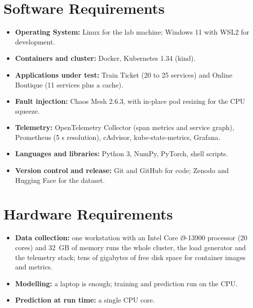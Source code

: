 \documentclass[12pt,a4paper]{report}
\begin{document}
\section{Software Requirements}
\begin{itemize}
\item \textbf{Operating System:} Linux for the lab machine; Windows 11 with WSL2 for development.
\item \textbf{Containers and cluster:} Docker, Kubernetes 1.34 (kind).
\item \textbf{Applications under test:} Train Ticket (20 to 25 services) and Online Boutique (11 services plus a cache).
\item \textbf{Fault injection:} Chaos Mesh 2.6.3, with in-place pod resizing for the CPU squeeze.
\item \textbf{Telemetry:} OpenTelemetry Collector (span metrics and service graph), Prometheus (5 s resolution), cAdvisor, kube-state-metrics, Grafana.
\item \textbf{Languages and libraries:} Python 3, NumPy, PyTorch, shell scripts.
\item \textbf{Version control and release:} Git and GitHub for code; Zenodo and Hugging Face for the dataset.
\end{itemize}

\section{Hardware Requirements}
\begin{itemize}
\item \textbf{Data collection:} one workstation with an Intel Core i9-13900 processor (20 cores) and 32~GB of memory runs the whole cluster, the load generator and the telemetry stack; tens of gigabytes of free disk space for container images and metrics.
\item \textbf{Modelling:} a laptop is enough; training and prediction run on the CPU.
\item \textbf{Prediction at run time:} a single CPU core.
\end{itemize}



\end{document}
